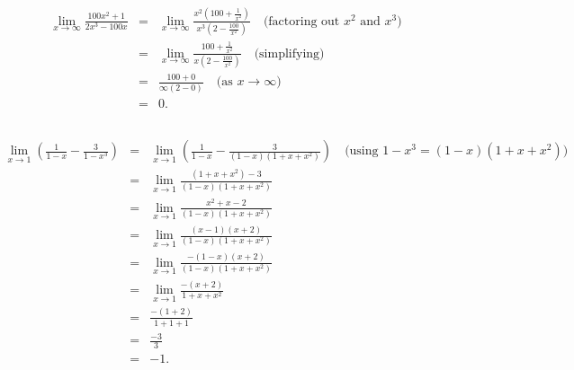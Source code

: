 \documentclass{article}
\begin{document}
\subsection{}
\[
\begin{array}{rcl}
	\lim_{x \to \infty} \frac{100x^2 + 1}{2x^3 - 100x} 
	& = & \lim_{x \to \infty} \frac{x^2(100 + \frac{1}{x^2})}{x^3(2 - \frac{100}{x^2})} \quad \text{(factoring out } x^2 \text{ and } x^3 \text{)} \\
	& = & \lim_{x \to \infty} \frac{100 + \frac{1}{x^2}}{x(2 - \frac{100}{x^2})} \quad \text{(simplifying)} \\
	& = & \frac{100 + 0}{\infty(2 - 0)} \quad \text{(as } x \to \infty \text{)} \\
	& = & 0.
\end{array}
\]

\subsection{}
\[
\begin{array}{rcl}
	\lim_{x \to 1} \left(\frac{1}{1-x} - \frac{3}{1-x^3}\right) 
	& = & \lim_{x \to 1} \left(\frac{1}{1-x} - \frac{3}{(1-x)(1+x+x^2)}\right) \quad \text{(using } 1 - x^3 = (1-x)(1+x+x^2)\text{)} \\
	& = & \lim_{x \to 1} \frac{(1+x+x^2) - 3}{(1-x)(1+x+x^2)} \\
	& = & \lim_{x \to 1} \frac{x^2 + x - 2}{(1-x)(1+x+x^2)} \\
	& = & \lim_{x \to 1} \frac{(x - 1)(x + 2)}{(1 - x)(1 + x + x^2)} \\
	& = & \lim_{x \to 1} \frac{-(1-x)(x + 2)}{(1 - x)(1 + x + x^2)} \\
	& = & \lim_{x \to 1} \frac{-(x + 2)}{1 + x + x^2} \\
	& = & \frac{-(1 + 2)}{1 + 1 + 1} \\
	& = & \frac{-3}{3} \\
	& = & -1.
\end{array}
\]
\end{document}
